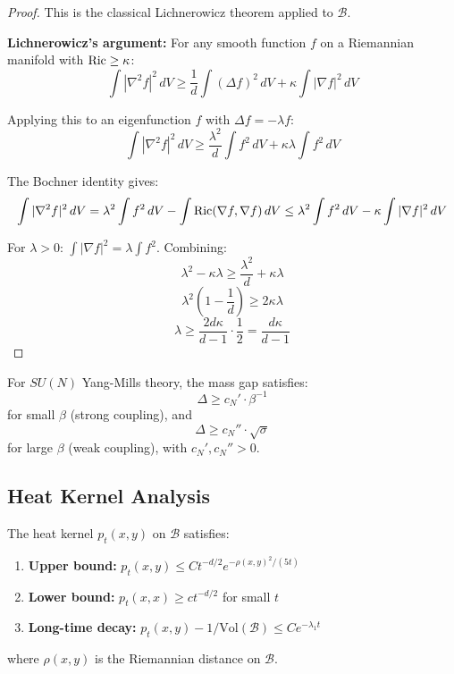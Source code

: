 \begin{proof}
This is the classical Lichnerowicz theorem applied to $\mathcal{B}$.

\textbf{Lichnerowicz's argument:}
For any smooth function $f$ on a Riemannian manifold with $\operatorname{Ric} \geq \kappa$:
\[
\int |\nabla^2 f|^2 \, dV \geq \frac{1}{d} \int (\Delta f)^2 \, dV + \kappa \int |\nabla f|^2 \, dV
\]

Applying this to an eigenfunction $f$ with $\Delta f = -\lambda f$:
\[
\int |\nabla^2 f|^2 \, dV \geq \frac{\lambda^2}{d} \int f^2 \, dV + \kappa \lambda \int f^2 \, dV
\]

The Bochner identity gives:
\[
\int |\nabla^2 f|^2 \, dV = \lambda^2 \int f^2 \, dV - \int \operatorname{Ric}(\nabla f, \nabla f) \, dV
\leq \lambda^2 \int f^2 \, dV - \kappa \int |\nabla f|^2 \, dV
\]

For $\lambda > 0$: $\int |\nabla f|^2 = \lambda \int f^2$. Combining:
\[
\lambda^2 - \kappa\lambda \geq \frac{\lambda^2}{d} + \kappa\lambda
\]
\[
\lambda^2 \left(1 - \frac{1}{d}\right) \geq 2\kappa\lambda
\]
\[
\lambda \geq \frac{2d\kappa}{d-1} \cdot \frac{1}{2} = \frac{d\kappa}{d-1}
\]
\end{proof}

\begin{corollary}
\label{cor:gap-curvature}
For $SU(N)$ Yang-Mills theory, the mass gap satisfies:
\[
\Delta \geq c_N' \cdot \beta^{-1}
\]
for small $\beta$ (strong coupling), and
\[
\Delta \geq c_N'' \cdot \sqrt{\sigma}
\]
for large $\beta$ (weak coupling), with $c_N', c_N'' > 0$.
\end{corollary}

\subsection{Heat Kernel Analysis}

\begin{theorem}
\label{thm:heat-kernel-gauge}
The heat kernel $p_t(x, y)$ on $\mathcal{B}$ satisfies:
\begin{enumerate}[label=(\roman*)]
\item \textbf{Upper bound:} $p_t(x, y) \leq C t^{-d/2} e^{-\rho(x,y)^2/(5t)}$
\item \textbf{Lower bound:} $p_t(x, x) \geq c t^{-d/2}$ for small $t$
\item \textbf{Long-time decay:} $p_t(x, y) - 1/\text{Vol}(\mathcal{B}) \leq C e^{-\lambda_1 t}$
\end{enumerate}
where $\rho(x,y)$ is the Riemannian distance on $\mathcal{B}$.
\end{theorem}

